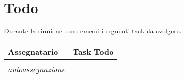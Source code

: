 \section{Todo}
Durante la riunione sono emersi i seguenti task da svolgere.

\begin{center}
  \begin{tabular}{|L{5cm}|L{8cm}|}
    \hline
    \textbf{Assegnatario} & \textbf{Task Todo} \\ \hline
        &   \\ \hline
    \textit{autoassegnazione} & \\ \hline
  \end{tabular}
\end{center}